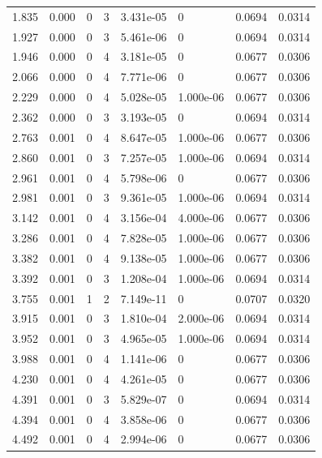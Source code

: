 \documentclass[preview]{standalone}
\begin{document}
{{\begin{tabular}{L{1.2cm}C{1.2cm} C{0.3cm}C{0.5cm} C{1.4cm}C{1.4cm} C{1.4cm}C{1.4cm}}
  1.835  &  0.000  & 0     &  3 &  3.431e-05  & 0  & 0.0694 &  0.0314   \\ 
  1.927  &  0.000  & 0     &  3 &  5.461e-06  & 0  & 0.0694 &  0.0314   \\ 
  1.946  &  0.000  & 0     &  4 &  3.181e-05  & 0  & 0.0677 &  0.0306   \\ 
  2.066  &  0.000  & 0     &  4 &  7.771e-06  & 0  & 0.0677 &  0.0306   \\ 
  2.229  &  0.000  & 0     &  4 &  5.028e-05  & 1.000e-06  & 0.0677 &  0.0306   \\ 
  2.362  &  0.000  & 0     &  3 &  3.193e-05  & 0  & 0.0694 &  0.0314   \\ 
  2.763  &  0.001  & 0     &  4 &  8.647e-05  & 1.000e-06  & 0.0677 &  0.0306   \\ 
  2.860  &  0.001  & 0     &  3 &  7.257e-05  & 1.000e-06  & 0.0694 &  0.0314   \\ 
  2.961  &  0.001  & 0     &  4 &  5.798e-06  & 0  & 0.0677 &  0.0306   \\ 
  2.981  &  0.001  & 0     &  3 &  9.361e-05  & 1.000e-06  & 0.0694 &  0.0314   \\ 
  3.142  &  0.001  & 0     &  4 &  3.156e-04  & 4.000e-06  & 0.0677 &  0.0306   \\ 
  3.286  &  0.001  & 0     &  4 &  7.828e-05  & 1.000e-06  & 0.0677 &  0.0306   \\ 
  3.382  &  0.001  & 0     &  4 &  9.138e-05  & 1.000e-06  & 0.0677 &  0.0306   \\ 
  3.392  &  0.001  & 0     &  3 &  1.208e-04  & 1.000e-06  & 0.0694 &  0.0314   \\ 
  3.755  &  0.001  & 1     &  2 &  7.149e-11  & 0  & 0.0707 &  0.0320   \\ 
  3.915  &  0.001  & 0     &  3 &  1.810e-04  & 2.000e-06  & 0.0694 &  0.0314   \\ 
  3.952  &  0.001  & 0     &  3 &  4.965e-05  & 1.000e-06  & 0.0694 &  0.0314   \\ 
  3.988  &  0.001  & 0     &  4 &  1.141e-06  & 0  & 0.0677 &  0.0306   \\ 
  4.230  &  0.001  & 0     &  4 &  4.261e-05  & 0  & 0.0677 &  0.0306   \\ 
  4.391  &  0.001  & 0     &  3 &  5.829e-07  & 0  & 0.0694 &  0.0314   \\ 
  4.394  &  0.001  & 0     &  4 &  3.858e-06  & 0  & 0.0677 &  0.0306   \\ 
  4.492  &  0.001  & 0     &  4 &  2.994e-06  & 0  & 0.0677 &  0.0306   \\ 

\end{tabular}}}
\end{document}
